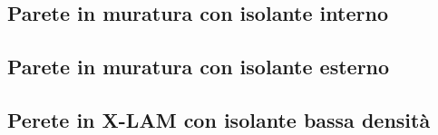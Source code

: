 \documentclass[a4paper,10pt]{report}
\begin{document}

\tableofcontents
\clearpage
\begingroup
    \let\clearpage\relax        %
        \listoftables
        \listoffigures
\endgroup
%



\clearpage
\begin{landscape}
        \subsection*{Parete in muratura con isolante interno}
                \begin{minipage}[c]{0.4\linewidth}
                        
                \end{minipage}
                \begin{minipage}[c]{0.6\linewidth}
                            
                \end{minipage}
        \subsection*{Parete in muratura con isolante esterno}
                \begin{minipage}[c]{0.4\linewidth}
                        
                \end{minipage}
                \begin{minipage}[c]{0.6\linewidth}
                            
                \end{minipage}
        \subsection*{Perete in X-LAM con isolante bassa densità}
                \begin{minipage}[c]{0.4\linewidth}
                        
                \end{minipage}
                \begin{minipage}[c]{0.6\linewidth}
                            
                \end{minipage}

\end{landscape}
\end{document}
